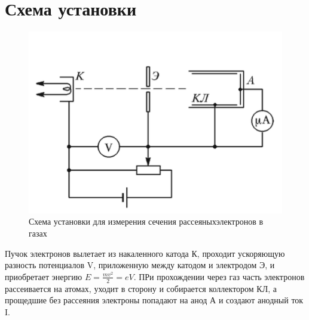 \documentclass[a4paper,14pt]{extarticle}
\begin{document}
\section{Схема установки} %
\label{sec:схема_установки}

\begin{figure}[h!]
	\centering
	\includegraphics[width = 0.7\linewidth]{scheme_513}
	\caption{Схема установки для измерения сечения рассеяныхэлектронов в газах}	
\end{figure}
Пучок электронов вылетает из накаленного катода К, проходит ускоряющую разность потенциалов V, приложенную между катодом и электродом Э, и приобретает энергию $E = \frac{mv^2}{2} = eV$. ПРи прохождении через газ часть электронов рассеивается на атомах, уходит в сторону и собирается коллектором КЛ, а прощедшие без рассеяния электроны попадают на анод А и создают анодный ток I. 
\end{document}
